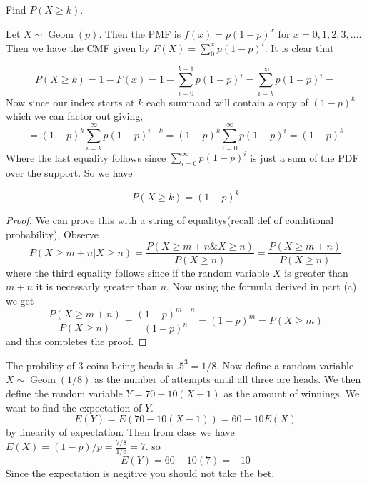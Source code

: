 \documentclass[11pt,largemargins]{homework}
\newcommand{\G}{\operatorname{Geom}}
\begin{document}
\maketitle

\question
\begin{alphaparts}
    \questionpart
    Find $P(X \geq k)$. 

    Let $X \sim \G(p)$. Then the PMF is $f(x) = p(1 - p)^x$ for $x = 0, 1, 2, 3, ...$. Then we have the CMF given by 
    $F(X) = \sum_0^x p(1 - p)^i$. It is clear that 

    \[P(X \geq k) = 1 - F(x) = 1 - \sum_{i = 0}^{k - 1} p(1 - p)^i = \sum_{i = k}^\infty p(1 - p)^i =   \]
    Now since our index starts at $k$ each summand will contain a copy of $(1 - p)^k$ which we can factor out giving,
    \[ = (1 - p)^k \sum_{i = k}^\infty p(1 - p)^{i - k} = (1 - p)^k \sum_{i = 0}^\infty p(1 - p)^{i} = (1 - p)^k\]
    Where the last equality follows since $\sum_{i = 0}^\infty p(1 - p)^{i}$ is just a sum of the PDF over the support. So we have 

    \[P(X \geq k) = (1 - p)^k\]


    \questionpart 
    \begin{proof}
    We can prove this with a string of equalitys(recall def of conditional probability), Observe
    \[P(X \geq m + n| X \geq n) = \frac{P(X \geq m + n \& X \geq n)}{P(X \geq n)} = \frac{P(X \geq m + n)}{P(X \geq n)}\]
    where the third equality follows since if the random variable $X$ is greater than $m + n$ it is necessarly greater than $n$. 
    Now using the formula derived in part (a) we get 
    \[\frac{P(X \geq m + n)}{P(X \geq n)} = \frac{(1 - p)^{m + n}}{(1 - p)^n} = (1 - p)^m = P(X \geq m)\]
    and this completes the proof. 
    \end{proof}
    
\end{alphaparts}

\question
The probility of 3 coins being heads is $.5^3 = 1/8$. Now define a random variable $X \sim \G(1/8)$ as the number of attempts until all 
three are heads. We then define the random variable $Y = 70 - 10(X - 1)$ as the amount of winnings. We want to find the expectation of 
$Y$. 
\[E(Y) = E(70 - 10(X - 1)) = 60 - 10E(X) \]
by linearity of expectation. Then from class we have $E(X) = (1 - p)/p = \frac{7/8 }{ 1/8 } = 7$. so 
\[E(Y) = 60 - 10(7) = -10\]
Since the expectation is negitive you should not take the bet. 
\end{document}
